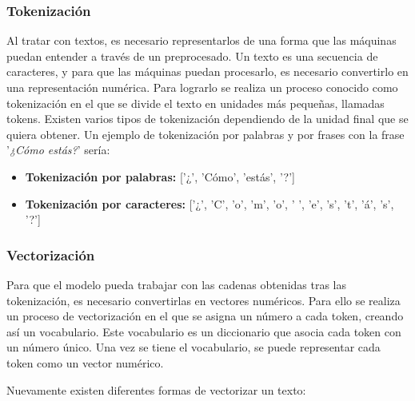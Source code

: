\subsubsection{Tokenización}

Al tratar con textos, es necesario representarlos de una forma que las máquinas puedan entender a través de un preprocesado.
Un texto es una secuencia de caracteres, y para que las máquinas puedan procesarlo, es necesario convertirlo en una representación numérica.
Para lograrlo se realiza un proceso conocido como tokenización\cite{medium:tokenization} en el que se divide el texto en unidades más pequeñas, llamadas tokens.
Existen varios tipos de tokenización dependiendo de la unidad final que se quiera obtener. Un ejemplo de tokenización por palabras y por frases con la frase '\textit{¿Cómo estás?}' sería:

\begin{itemize}
	\item \textbf{Tokenización por palabras:} ['¿', 'Cómo', 'estás', '?']
	\item \textbf{Tokenización por caracteres:} ['¿', 'C', 'o', 'm', 'o', ' ', 'e', 's', 't', 'á', 's', '?']
\end{itemize}

\subsubsection{Vectorización}

Para que el modelo pueda trabajar con las cadenas obtenidas tras las tokenización, es necesario convertirlas en vectores numéricos.
Para ello se realiza un proceso de vectorización en el que se asigna un número a cada token, creando así un vocabulario.
Este vocabulario es un diccionario que asocia cada token con un número único.
Una vez se tiene el vocabulario, se puede representar cada token como un vector numérico.

Nuevamente existen diferentes formas de vectorizar\cite{medium:vectorization} un texto:

